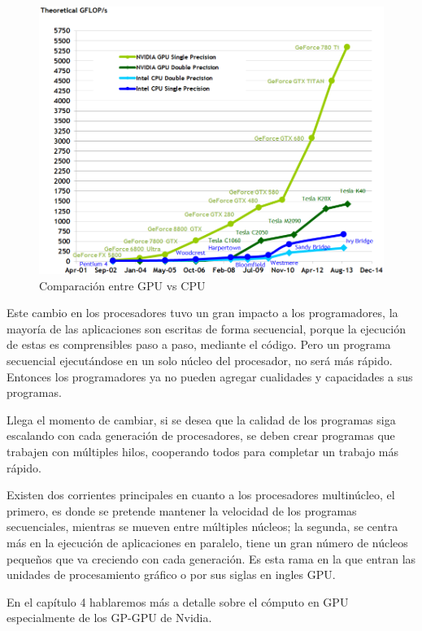 \begin{figure}[ph]
			\centering
				\includegraphics[scale=0.7]{img/flops.png}
			\caption{Comparación entre GPU vs CPU \cite{Flops} }
\end{figure}

Este cambio en los procesadores tuvo un gran impacto a los programadores, la mayoría de las aplicaciones son escritas de forma secuencial,  porque la ejecución de estas es comprensibles paso a paso, mediante el código. Pero un programa secuencial ejecutándose en un solo núcleo del procesador, no será más rápido. Entonces los programadores ya no pueden agregar cualidades y capacidades a sus programas.


Llega el momento de cambiar, si se desea que la calidad de los programas siga escalando con cada generación de procesadores, se deben crear programas que trabajen con múltiples hilos, cooperando todos para completar un trabajo más rápido. 

Existen dos corrientes principales en cuanto a los procesadores multinúcleo, el primero, es donde se pretende mantener la velocidad de los programas secuenciales, mientras se mueven entre múltiples núcleos; la segunda, se centra más en la ejecución de aplicaciones en paralelo, tiene un gran número de núcleos pequeños que va creciendo con cada generación. Es esta rama en la que entran las unidades de procesamiento gráfico o por sus siglas en ingles GPU.\cite{Kirk2010} 

En el capítulo 4 hablaremos más a detalle sobre el cómputo en GPU especialmente de los GP-GPU de Nvidia.
